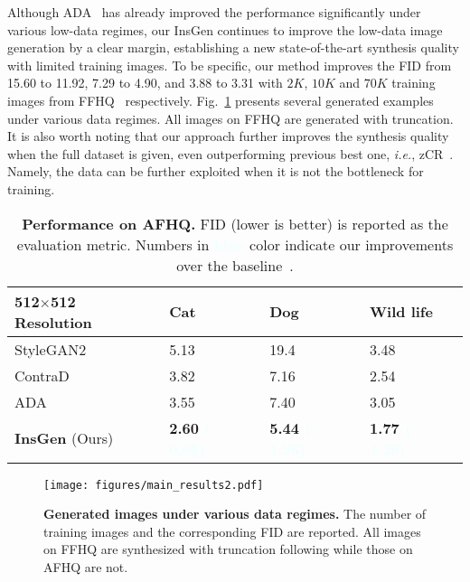 \documentclass{article}
\begin{document}
Although ADA~\cite{karras2020training} has already improved the performance significantly under various low-data regimes, our
InsGen continues to improve the low-data image generation by a clear margin, establishing a new state-of-the-art synthesis quality with limited training images. To be specific, our method improves the FID from 15.60 to 11.92, 7.29 to 4.90, and 3.88 to 3.31 with $2K$, $10K$ and $70K$ training images from FFHQ~\cite{karras2019style} respectively. Fig.~\ref{fig:main_results} presents several generated examples under various data regimes. All images on FFHQ are generated with truncation. It is also worth noting that our approach further improves the synthesis quality when the full dataset is given, even outperforming previous best one, \textit{i.e.}, zCR~\cite{zhao2020improved}. Namely, the data can be further exploited when it is not the bottleneck for training.


\setlength{\tabcolsep}{15pt}
\begin{table}[t]
    \centering
    \caption{
        \textbf{Performance on AFHQ.}
FID (lower is better) is reported as the evaluation metric.
Numbers in \textbf{\textcolor{azure}{blue}} color indicate our improvements over the baseline~\cite{karras2020training}.
    }
    \label{table:sota-afhq}
    \vspace{0pt}
        \begin{tabular}{llll}
        \toprule
        512$\times$512 Resolution                     & Cat    &  Dog   & Wild life  \\
        \midrule
        StyleGAN2~\cite{karras2019style}              & 5.13   & 19.4   & 3.48 \\
        ContraD~\cite{jeong2021training}              & 3.82   & 7.16   & 2.54 \\
        ADA~\cite{karras2020training}                 & 3.55   & 7.40   & 3.05 \\
        \midrule
        \textbf{InsGen} (Ours) & \textbf{2.60 \textcolor{azure}{($-$0.95)}}  & \textbf{5.44 \textcolor{azure}{($-$1.96)}}  & \textbf{1.77 \textcolor{azure}{($-$1.28)}} \\
        \bottomrule
    \end{tabular}
    \vspace{-5pt}
\end{table}


\begin{figure}[t]
	\centering
	\texttt{[image: figures/main\_results2.pdf]}
	\vspace{-10pt}
	\caption{
	    \textbf{Generated images under various data regimes.}
The number of training images and the corresponding FID are reported.
All images on FFHQ are synthesized with truncation following \cite{karras2020training} while those on AFHQ are not.
	}
    \label{fig:main_results}
    \vspace{-8pt}
\end{figure}
\end{document}
